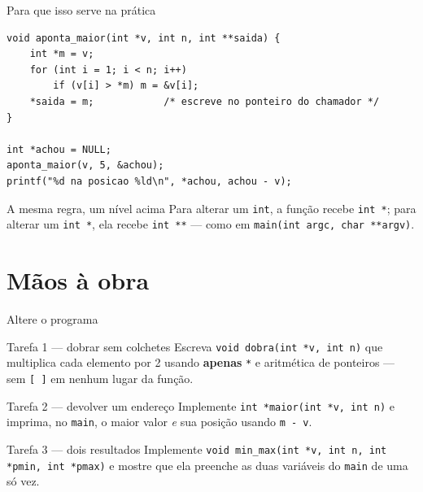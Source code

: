 \documentclass[aspectratio=169]{beamer}
\begin{document}
\begin{frame}[fragile]{Para que isso serve na prática}
\vspace{-2mm}
\begin{lstlisting}
void aponta_maior(int *v, int n, int **saida) {
    int *m = v;
    for (int i = 1; i < n; i++)
        if (v[i] > *m) m = &v[i];
    *saida = m;            /* escreve no ponteiro do chamador */
}

int *achou = NULL;
aponta_maior(v, 5, &achou);
printf("%d na posicao %ld\n", *achou, achou - v);
\end{lstlisting}
\vspace{-2mm}
  \begin{exampleblock}{A mesma regra, um nível acima}
    Para alterar um \texttt{int}, a função recebe \texttt{int *}; para alterar
    um \texttt{int *}, ela recebe \texttt{int **} --- como em
    \texttt{main(int argc, char **argv)}.
  \end{exampleblock}
\end{frame}

\section{Mãos à obra}

\begin{frame}{Altere o programa}
  \begin{block}{Tarefa 1 --- dobrar sem colchetes}
    Escreva \texttt{void dobra(int *v, int n)} que multiplica cada elemento
    por 2 usando \textbf{apenas} \texttt{*} e aritmética de ponteiros --- sem
    \texttt{[\,]} em nenhum lugar da função.
  \end{block}
  \begin{block}{Tarefa 2 --- devolver um endereço}
    Implemente \texttt{int *maior(int *v, int n)} e imprima, no
    \texttt{main}, o maior valor \emph{e} sua posição usando \texttt{m - v}.
  \end{block}
  \begin{block}{Tarefa 3 --- dois resultados}
    Implemente \texttt{void min\_max(int *v, int n, int *pmin, int *pmax)}
    e mostre que ela preenche as duas variáveis do \texttt{main} de uma só vez.
  \end{block}
\end{frame}
\end{document}
